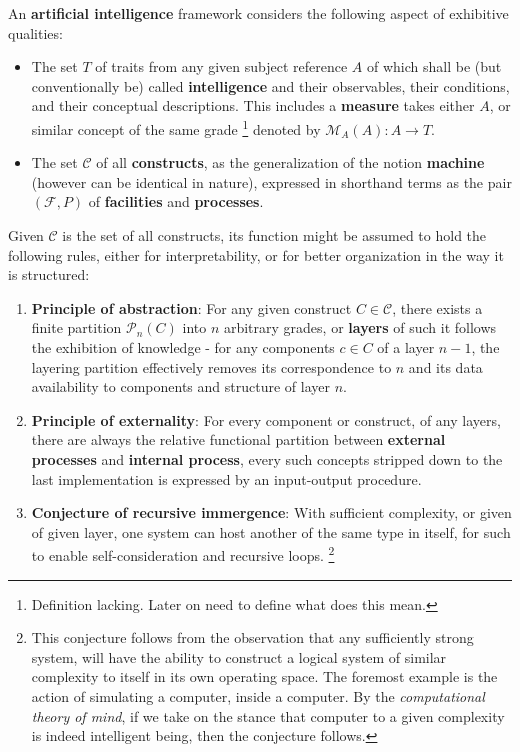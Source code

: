 \begin{theorem}
    An \textbf{artificial intelligence} framework considers the following aspect of exhibitive qualities:
    \begin{itemize}
        \item The set $T$ of traits from any given subject reference $A$ of which shall be (but conventionally be) called \textbf{intelligence} and their observables, their conditions, and their conceptual descriptions. This includes a \textbf{measure} takes either $A$, or similar concept of the same grade \footnote{Definition lacking. Later on need to define what does this mean.} denoted by $\mathcal{M}_{A}(A): A\to T$.
        \item The set $\mathcal{C}$ of all \textbf{constructs}, as the generalization of the notion \textbf{machine} (however can be identical in nature), expressed in shorthand terms as the pair $(\mathcal{F},P)$ of \textbf{facilities} and \textbf{processes}. 
    \end{itemize}
    Given $\mathcal{C}$ is the set of all constructs, its function might be assumed to hold the following rules, either for interpretability, or for better organization in the way it is structured: 
    \begin{enumerate}
        \item \textbf{Principle of abstraction}: For any given construct $C\in \mathcal{C}$, there exists a finite partition $\mathcal{P}_{n}(C)$ into $n$ arbitrary grades, or \textbf{layers} of such it follows the exhibition of knowledge - for any components $c\in C$ of a layer $n-1$, the layering partition effectively removes its correspondence to $n$ and its data availability to components and structure of layer $n$.
        \item \textbf{Principle of externality}: For every component or construct, of any layers, there are always the relative functional partition between \textbf{external processes} and \textbf{internal process}, every such concepts stripped down to the last implementation is expressed by an input-output procedure.  
        \item \textbf{Conjecture of recursive immergence}: With sufficient complexity, or given of given layer, one system can host another of the same type in itself, for such to enable self-consideration and recursive loops. \footnote{This conjecture follows from the observation that any sufficiently strong system, will have the ability to construct a logical system of similar complexity to itself in its own operating space. The foremost example is the action of simulating a computer, inside a computer. By the \textit{computational theory of mind}, if we take on the stance that computer to a given complexity is indeed intelligent being, then the conjecture follows.}

\end{enumerate}
\end{theorem}
